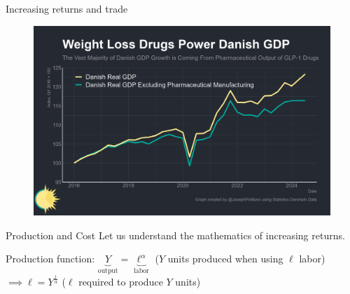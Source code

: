 \documentclass[notes,11pt, aspectratio=169, xcolor=table]{beamer}
\newenvironment{wideitemize}{\itemize\addtolength{\itemsep}{10pt}}{\enditemize}
\begin{document}
\begin{frame}{Increasing returns and trade}
\normalsize

\begin{figure}
    \centering
    \includegraphics[width=0.8\linewidth]{figs/e081761e-ec32-4ea4-b1c8-e051139c24bf_2886x1843.png}
\end{figure}


\end{frame}


\begin{frame}{Production and Cost}
\Large Let us understand the mathematics of increasing returns.
\normalsize
\begin{wideitemize}
    \item Production function: $\underbrace{Y}_{\text{output}} = \underbrace{\ell^\alpha}_{\text{labor}}$ ($Y$ units produced when using $\ell$ labor) \\ $\implies \ell = Y^{\frac{1}{\alpha}}$ ($\ell$ required to produce $Y$ units)
\end{wideitemize}


\end{frame}
\end{document}
